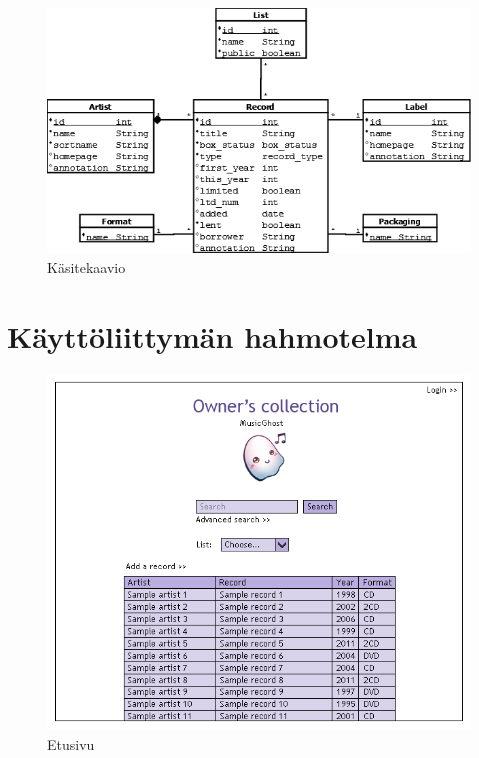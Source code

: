 \documentclass[a4paper,12pt]{report}
\begin{document}
\begin{figure}[htb]
\begin{center}
\leavevmode
\includegraphics[width=\textwidth]{kasitekaavio}
\end{center}
\caption{Käsitekaavio}
\label{fig:kasitekaavio}
\end{figure}

\section{Käyttöliittymän hahmotelma}

\begin{figure}[H]
\begin{center}
\includegraphics[width=\textwidth]{mainwindow2}
\end{center}
\caption{Etusivu}
\end{figure}
\end{document}
